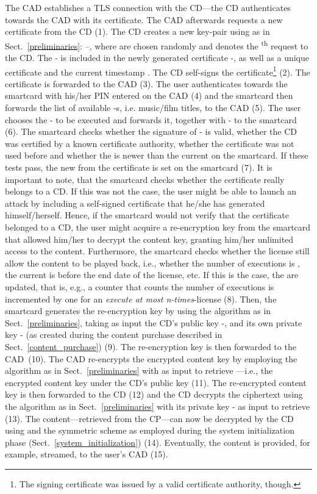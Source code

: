 \documentclass{llncs}
\newcommand{\refSec}[1]{Sect.~\ref{#1}}
\begin{document}
The CAD establishes a TLS connection \cite{tls_rfc} with the CD---the CD authenticates towards the CAD with its certificate. The CAD afterwards requests a new certificate from the CD (1). The CD creates a new key-pair using  as in \refSec{preliminaries}: --, where  are chosen randomly and  denotes the \textsuperscript{th} request to the CD. The - is included in the newly generated certificate -, as well as a unique certificate  and the current timestamp . The CD self-signs the certificate\footnote{The signing certificate was issued by a valid certificate authority, though.} (2). The certificate is forwarded to the CAD (3). The user authenticates towards the smartcard with his/her PIN entered on the CAD (4) and the smartcard then forwards the list of available -s, i.e. music/film titles, to the CAD (5). The user chooses the - to be executed and forwards it, together with - to the smartcard (6). The smartcard checks whether the signature of - is valid, whether the CD was certified by a known certificate authority, whether the certificate  was not used before and whether the  is newer than the current  on the smartcard. If these tests pass, the new  from the certificate is set on the smartcard (7). It is important to note, that the smartcard checks whether the certificate really belongs to a CD. If this was not the case, the user might be able to launch an attack by including a self-signed certificate that he/she has generated himself/herself. Hence, if the smartcard would not verify that the certificate belonged to a CD, the user might acquire a re-encryption key from the smartcard that allowed him/her to decrypt the content key, granting him/her unlimited access to the content. Furthermore, the smartcard checks whether the license  still allow the content to be played back, i.e., whether the number of executions is , the current  is before the end date of the license, etc. If this is the case, the  are updated, that is, e.g., a counter that counts the number of executions is incremented by one for an \emph{execute at most n-times}-license (8). Then, the smartcard generates the re-encryption key  by using the  algorithm as in \refSec{preliminaries}, taking as input the CD's public key -, and its own private key - (as created during the content purchase described in \refSec{content_purchase}) (9). The re-encryption key is then forwarded to the CAD~(10). The CAD re-encrypts the encrypted content key  by employing the  algorithm as in \refSec{preliminaries} with  as input to retrieve ---i.e., the encrypted content key under the CD's public key (11). The re-encrypted content key is then forwarded to the CD (12) and the CD decrypts the ciphertext using the  algorithm as in \refSec{preliminaries} with its private key - as input to retrieve  (13). The content---retrieved from the CP---can now be decrypted by the CD using  and the symmetric scheme as employed during the system initialization phase (\refSec{system_initialization}) (14). Eventually, the content is provided, for example, streamed, to the user's CAD (15). 
\end{document}
